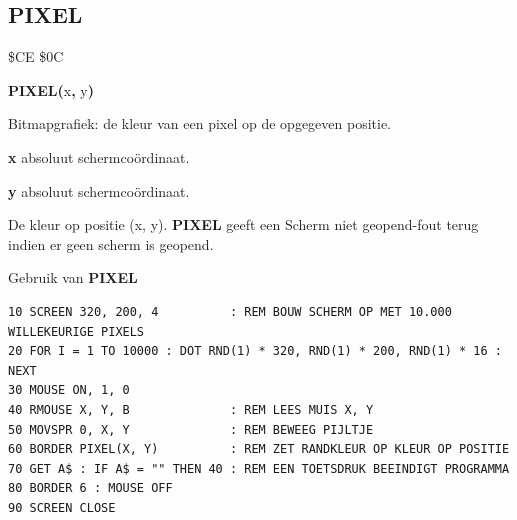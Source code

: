 
\newpage
\subsection{PIXEL}
\begin{description}[leftmargin=2cm,style=nextline]
\item [Token:]    \$CE \$0C

\item [Formaat:]   {\bf PIXEL(}x{\bf,} y{\bf)}

\item [Gebruik:]    Bitmapgrafiek: de kleur van een pixel op de opgegeven positie.

                  {\bf x} absoluut schermcoördinaat.

                  {\bf y} absoluut schermcoördinaat.

\item [Retourneert:]  De kleur op positie (x, y). {\bf PIXEL} geeft een Scherm niet geopend-fout terug indien er geen scherm is geopend.

\item [Voorbeeld:]  Gebruik van {\bf PIXEL}

\begin{tcolorbox}[colback=black,coltext=white]
\verbatimfont{\codefont}
\begin{verbatim}
10 SCREEN 320, 200, 4          : REM BOUW SCHERM OP MET 10.000 WILLEKEURIGE PIXELS
20 FOR I = 1 TO 10000 : DOT RND(1) * 320, RND(1) * 200, RND(1) * 16 : NEXT
30 MOUSE ON, 1, 0
40 RMOUSE X, Y, B              : REM LEES MUIS X, Y
50 MOVSPR 0, X, Y              : REM BEWEEG PIJLTJE
60 BORDER PIXEL(X, Y)          : REM ZET RANDKLEUR OP KLEUR OP POSITIE
70 GET A$ : IF A$ = "" THEN 40 : REM EEN TOETSDRUK BEEINDIGT PROGRAMMA
80 BORDER 6 : MOUSE OFF
90 SCREEN CLOSE
\end{verbatim}
\end{tcolorbox}
\end{description}


\newpage
